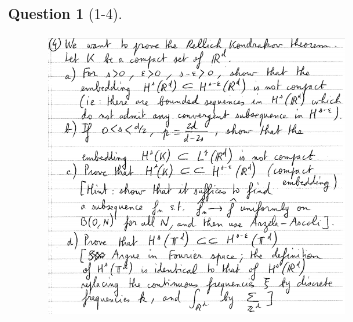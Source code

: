 \documentclass[11pt]{article}
\theoremstyle{plain}
\theoremstyle{quest}
\newtheorem*{question}{Question}
\begin{document}
\begin{question}[1-4]
\hfill
\begin{figure}[h!]
  \centering
    \includegraphics[width=0.7\textwidth]{pde2-s34-p4.png}
\end{figure}
\end{question}
\end{document}
